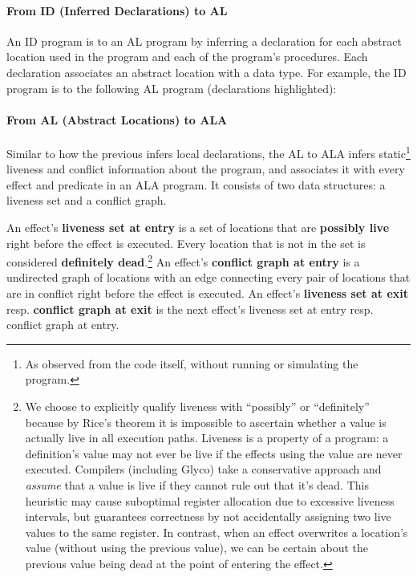 \documentclass[main.tex]{subfiles}
\begin{document}
\paragraph{From ID (Inferred Declarations) to AL} An ID program is \lowered{} to an AL program by inferring a declaration for each abstract location used in the program and each of the program's procedures. Each declaration associates an abstract location with a data type. For example, the ID program
is \lowered{} to the following AL program (declarations highlighted):

\paragraph{From AL (Abstract Locations) to ALA} Similar to how the previous  infers local declarations, the AL to ALA  infers static\footnote{As observed from the code itself, without running or simulating the program.} liveness and conflict information about the program, and associates it with every effect and predicate in an ALA program. It consists of two data structures: a liveness set and a conflict graph.

An effect's \textbf{liveness set at entry} is a set of locations that are \textbf{possibly live} right before the effect is executed. Every location that is not in the set is considered \textbf{definitely dead}.\footnote{We choose to explicitly qualify liveness with \enquote{possibly} or \enquote{definitely} because by Rice's theorem it is impossible to ascertain whether a value is actually live in all execution paths. Liveness is a property of a program: a definition's value may not ever be live if the effects using the value are never executed. Compilers (including Glyco) take a conservative approach and \emph{assume} that a value is live if they cannot rule out that it's dead. This heuristic may cause suboptimal register allocation due to excessive liveness intervals, but guarantees correctness by not accidentally assigning two live values to the same register. In contrast, when an effect overwrites a location's value (without using the previous value), we can be certain about the previous value being dead at the point of entering the effect.} An effect's \textbf{conflict graph at entry} is a undirected graph of locations with an edge connecting every pair of locations that are in conflict right before the effect is executed. An effect's \textbf{liveness set at exit} resp. \textbf{conflict graph at exit} is the next effect's liveness set at entry resp. conflict graph at entry.
\end{document}

